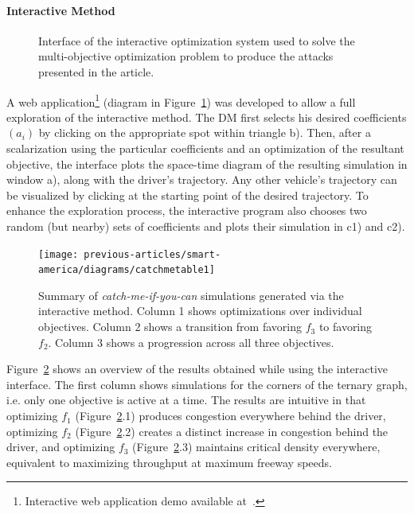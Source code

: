 \paragraph{Interactive Method}


\begin{figure}[t]
\centering
{}%
%

\caption{Interface of the interactive optimization system used to solve the multi-objective optimization problem to produce the attacks presented in the article.}

\label{fig:webinterface}
\end{figure}

 A web application\footnote{Interactive web application demo available at~\cite{smartroadswebsite}.} (diagram in Figure~\ref{fig:webinterface}) was developed to allow a full exploration of the interactive method. The DM first selects his desired coefficients $(a_i)$ by clicking on the appropriate spot within triangle b). Then, after a scalarization using the particular coefficients and an optimization of the resultant objective, the interface plots the space-time diagram of the resulting simulation in window a), along with the driver's trajectory. Any other vehicle's trajectory can be visualized by clicking at the starting point of the desired trajectory. To enhance the exploration process, the interactive program also chooses two random (but nearby) sets of coefficients and plots their simulation in c1) and c2).


\begin{figure}[t]
	\centering
	  \texttt{[image: previous-articles/smart-america/diagrams/catchmetable1]}
	\caption{Summary of \emph{catch-me-if-you-can} simulations generated via the interactive method. Column 1 shows optimizations over individual objectives. Column 2 shows a transition from favoring $f_3$ to favoring $f_2$. Column 3 shows a progression across all three objectives.}
	\label{fig:catchme_table_1}
\end{figure}
Figure~\ref{fig:catchme_table_1} shows an overview of the results obtained while using the interactive interface. The first column shows simulations for the corners of the ternary graph, i.e. only one objective is active at a time. The results are intuitive in that optimizing $f_1$ (Figure~\ref{fig:catchme_table_1}.1) produces congestion everywhere behind the driver, optimizing $f_2$ (Figure~\ref{fig:catchme_table_1}.2) creates a distinct increase in congestion behind the driver, and optimizing $f_3$ (Figure~\ref{fig:catchme_table_1}.3) maintains critical density everywhere, equivalent to maximizing throughput at maximum freeway speeds.

